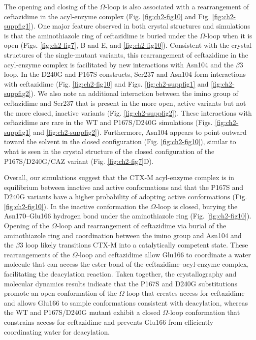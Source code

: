 \documentclass[../main.tex]{subfiles}
\begin{document}
        The opening and closing of the $\Omega$-loop is also associated with a rearrangement of ceftazidime in the acyl-enzyme complex (Fig. \ref{fig:ch2-fig10} and Fig. \ref{fig:ch2-suppfig1}). One major feature observed in both crystal structures and simulations is that the aminothiazole ring of ceftazidime is buried under the $\Omega$-loop when it is open (Figs. \ref{fig:ch2-fig7}, B and E, and \ref{fig:ch2-fig10}). Consistent with the crystal structures of the single-mutant variants, this rearrangement of ceftazidime in the acyl-enzyme complex is facilitated by new interactions with Asn104 and the $\beta$3 loop. In the D240G and P167S constructs, Ser237 and Asn104 form interactions with ceftazidime (Fig. \ref{fig:ch2-fig10} and Figs. \ref{fig:ch2-suppfig1} and \ref{fig:ch2-suppfig2}). We also note an additional interaction between the imino group of ceftazidime and Ser237 that is present in the more open, active variants but not the more closed, inactive variants (Fig. \ref{fig:ch2-suppfig2}). These interactions with ceftazidime are rare in the WT and P167S/D240G simulations (Figs. \ref{fig:ch2-suppfig1} and \ref{fig:ch2-suppfig2}). Furthermore, Asn104 appears to point outward toward the solvent in the closed configuration (Fig. \ref{fig:ch2-fig10}), similar to what is seen in the crystal structure of the closed configuration of the P167S/D240G/CAZ variant (Fig. \ref{fig:ch2-fig7}D).

        Overall, our simulations suggest that the CTX-M acyl-enzyme complex is in equilibrium between inactive and active conformations and that the P167S and D240G variants have a higher probability of adopting active conformations (Fig. \ref{fig:ch2-fig10}). In the inactive conformation the $\Omega$-loop is closed, burying the Asn170–Glu166 hydrogen bond under the aminothiazole ring (Fig. \ref{fig:ch2-fig10}). Opening of the $\Omega$-loop and rearrangement of ceftazidime via burial of the aminothiazole ring and coordination between the imino group and Asn104 and the $\beta$3 loop likely transitions CTX-M into a catalytically competent state. These rearrangements of the $\Omega$-loop and ceftazidime allow Glu166 to coordinate a water molecule that can access the ester bond of the ceftazidime–acyl-enzyme complex, facilitating the deacylation reaction. Taken together, the crystallography and molecular dynamics results indicate that the P167S and D240G substitutions promote an open conformation of the $\Omega$-loop that creates access for ceftazidime and allows Glu166 to sample conformations consistent with deacylation, whereas the WT and P167S/D240G mutant exhibit a closed $\Omega$-loop conformation that constrains access for ceftazidime and prevents Glu166 from efficiently coordinating water for deacylation.
\end{document}
